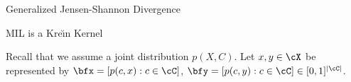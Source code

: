 \documentclass[final]{beamer}
\newcommand{\kr}{Kre\u{\i}n\xspace}
\DeclareMathOperator{\hel}{hel}
\newlength{\threecolwid}
\begin{document}
\begin{frame}[t]
\begin{columns}[t]
\begin{column}{\threecolwid}
\begin{block}{Generalized Jensen-Shannon 
			Divergence}
%		
		
	\end{block}
	\begin{block}{MIL is a \kr Kernel}
 		
 		
 		
 		Recall that we assume a joint distribution $ 
 		p(X,C) $.
 		Let $ x,y\in \cX $ be represented 
 		by 
 		$\bfx=[p(c,x):c\in \cC]$, $ \bfy=[p(c,y):c\in 
 		\cC]\in 
 		[0,1]^{|\cC|}$.
 		

\end{block}
\end{column}
\end{columns}
\end{frame}
\end{document}
